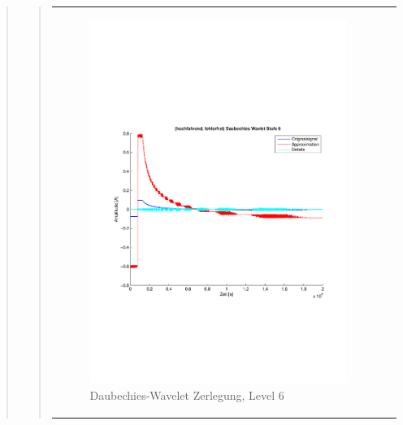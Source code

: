\begin{quote}
\begin{quote}
\begin{center}
\begin{tabular}{ll}
\begin{minipage}{0.6\textwidth}
                    \end{minipage}
                    \begin{minipage}{0.6\textwidth}
    
                        \begin{figure}[H]
                            \label{fig:}
                            \includegraphics[scale=0.4, trim = 2cm 6cm 1cm
                            7.5cm,
                            clip]{./Bilder/Termin8/fehlerfrei_hochlaufen_Daubechies_Wavlet_lvl_6}
                            \caption{Daubechies-Wavelet Zerlegung, Level 6}
                        \end{figure}
                    \vspace{-1.5em}
    
                    \end{minipage}
    

\end{tabular}
\end{center}
\end{quote}
\end{quote}
